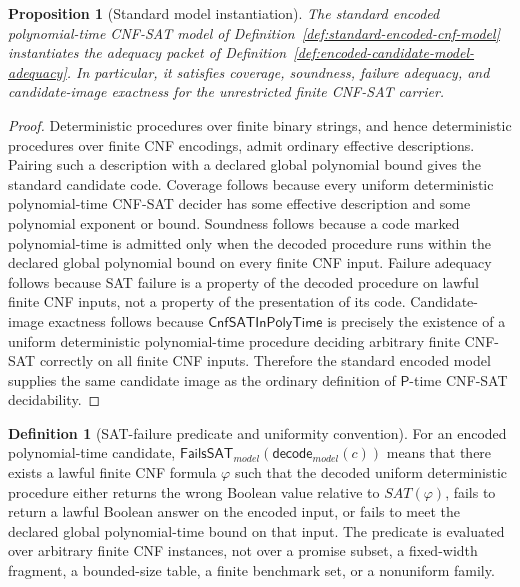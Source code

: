 \documentclass[11pt]{article}
\newtheorem{proposition}[theorem]{Proposition}
\theoremstyle{definition}
\newtheorem{definition}[theorem]{Definition}
\theoremstyle{remark}
\newcommand{\CnfSATP}{\mathsf{CnfSATInPolyTime}}
\newcommand{\Pclass}{\mathsf{P}}
\newcommand{\FailsSAT}{\mathsf{FailsSAT}}
\newcommand{\Decode}{\mathsf{decode}}
\begin{document}
\begin{proposition}[Standard model instantiation]\label{prop:standard-model-instantiation}
The standard encoded polynomial-time CNF-SAT model of Definition~\ref{def:standard-encoded-cnf-model} instantiates the adequacy packet of Definition~\ref{def:encoded-candidate-model-adequacy}. In particular, it satisfies coverage, soundness, failure adequacy, and candidate-image exactness for the unrestricted finite CNF-SAT carrier.
\end{proposition}

\begin{proof}
Deterministic procedures over finite binary strings, and hence deterministic procedures over finite CNF encodings, admit ordinary effective descriptions. Pairing such a description with a declared global polynomial bound gives the standard candidate code. Coverage follows because every uniform deterministic polynomial-time CNF-SAT decider has some effective description and some polynomial exponent or bound. Soundness follows because a code marked polynomial-time is admitted only when the decoded procedure runs within the declared global polynomial bound on every finite CNF input. Failure adequacy follows because SAT failure is a property of the decoded procedure on lawful finite CNF inputs, not a property of the presentation of its code. Candidate-image exactness follows because \(\CnfSATP\) is precisely the existence of a uniform deterministic polynomial-time procedure deciding arbitrary finite CNF-SAT correctly on all finite CNF inputs. Therefore the standard encoded model supplies the same candidate image as the ordinary definition of \(\Pclass\)-time CNF-SAT decidability.
\end{proof}

\begin{definition}[SAT-failure predicate and uniformity convention]\label{def:sat-failure-uniformity}
For an encoded polynomial-time candidate, \(\FailsSAT_{model}(\Decode_{model}(c))\) means that there exists a lawful finite CNF formula \(\varphi\) such that the decoded uniform deterministic procedure either returns the wrong Boolean value relative to \(SAT(\varphi)\), fails to return a lawful Boolean answer on the encoded input, or fails to meet the declared global polynomial-time bound on that input. The predicate is evaluated over arbitrary finite CNF instances, not over a promise subset, a fixed-width fragment, a bounded-size table, a finite benchmark set, or a nonuniform family.
\end{definition}
\end{document}
